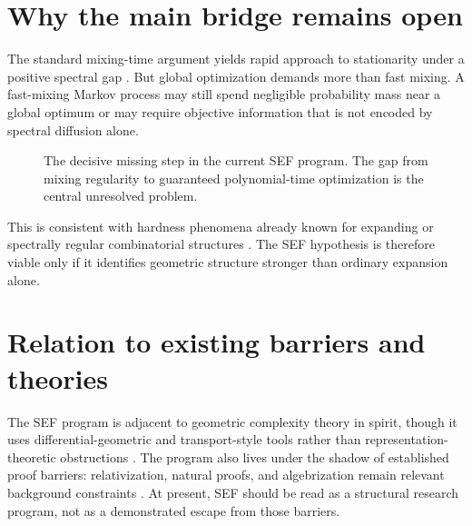 \documentclass{svjour3}
\begin{document}
\section{Why the main bridge remains open}
The standard mixing-time argument yields rapid approach to stationarity under a positive spectral gap \citep{levin2009markov}. But global optimization demands more than fast mixing. A fast-mixing Markov process may still spend negligible probability mass near a global optimum or may require objective information that is not encoded by spectral diffusion alone.

\begin{figure}[t]
\centering
{}
\caption{The decisive missing step in the current SEF program. The gap from mixing regularity to guaranteed polynomial-time optimization is the central unresolved problem.}
\label{fig:sef-gap}
\end{figure}

This is consistent with hardness phenomena already known for expanding or spectrally regular combinatorial structures \citep{arora1998proof}. The SEF hypothesis is therefore viable only if it identifies geometric structure stronger than ordinary expansion alone.

\section{Relation to existing barriers and theories}
The SEF program is adjacent to geometric complexity theory in spirit, though it uses differential-geometric and transport-style tools rather than representation-theoretic obstructions \citep{mulmuley2001gct}. The program also lives under the shadow of established proof barriers: relativization, natural proofs, and algebrization remain relevant background constraints \citep{baker1975relativizations,razborov1997natural,aaronson2009algebrization}. At present, SEF should be read as a structural research program, not as a demonstrated escape from those barriers.
\end{document}
